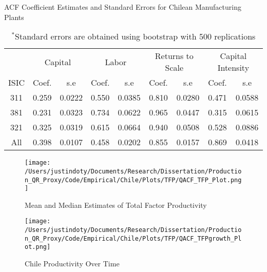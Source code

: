 \documentclass[11pt]{article}
\begin{document}
\begin{table}[H]
\centering
\caption{ACF Coefficient Estimates and Standard Errors for Chilean Manufacturing Plants}
\begin{tabular}{ccccccccc}
  \hline\hline & \multicolumn{2}{c}{Capital} & \multicolumn{2}{c}{Labor} & \multicolumn{2}{c}{Returns to Scale} & \multicolumn{2}{c}{Capital Intensity}\\ \cmidrule(lr){2-3} \cmidrule(lr){4-5} \cmidrule(lr){6-7} \cmidrule(lr){8-9}ISIC & Coef. & s.e & Coef. & s.e & Coef. & s.e & Coef. & s.e \\ 
  \hline
311 & 0.259 & 0.0222 & 0.550 & 0.0385 & 0.810 & 0.0280 & 0.471 & 0.0588 \\ 
  381 & 0.231 & 0.0323 & 0.734 & 0.0622 & 0.965 & 0.0447 & 0.315 & 0.0615 \\ 
  321 & 0.325 & 0.0319 & 0.615 & 0.0664 & 0.940 & 0.0508 & 0.528 & 0.0886 \\ 
  All & 0.398 & 0.0107 & 0.458 & 0.0202 & 0.855 & 0.0157 & 0.869 & 0.0418 \\ 
   \hline
\end{tabular}
\caption*{\footnotesize $^{*}$Standard errors are obtained using bootstrap with 500 replications}
\label{CHLACFCoef}
\end{table}

\begin{figure}[H]
\centering
\caption{Mean and Median Estimates of Total Factor Productivity}
\texttt{[image: /Users/justindoty/Documents/Research/Dissertation/Production\_QR\_Proxy/Code/Empirical/Chile/Plots/TFP/QACF\_TFP\_Plot.png]}
\label{fig:ACFCHLTFPDens}
\end{figure}

\begin{figure}[H]
\centering
\caption{Chile Productivity Over Time}
\texttt{[image: /Users/justindoty/Documents/Research/Dissertation/Production\_QR\_Proxy/Code/Empirical/Chile/Plots/TFP/QACF\_TFPgrowth\_Plot.png]}
\label{fig:ACFCHLpgrowth}
\end{figure}
\end{document}
